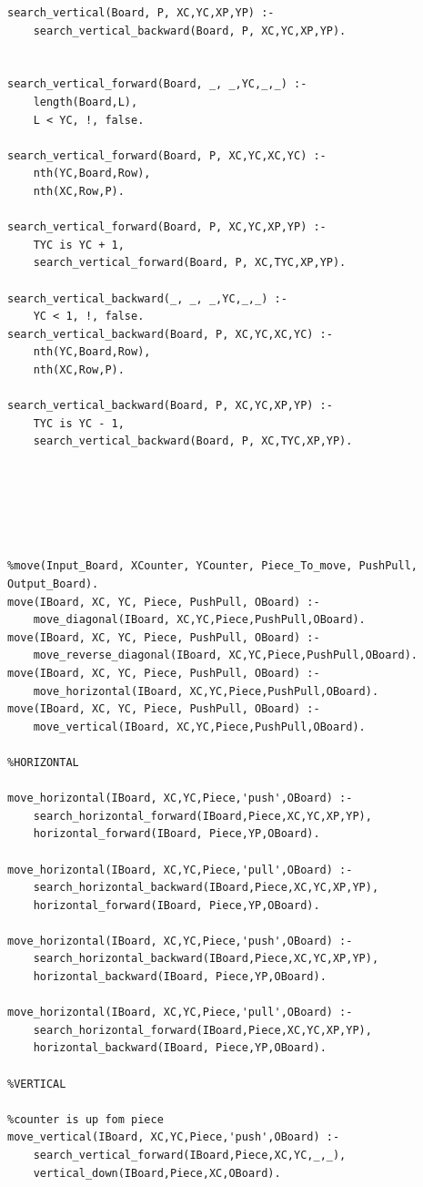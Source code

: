 \documentclass[15pt,a4paper]{article}
\begin{document}
\begin{verbatim}
search_vertical(Board, P, XC,YC,XP,YP) :- 
	search_vertical_backward(Board, P, XC,YC,XP,YP).


search_vertical_forward(Board, _, _,YC,_,_) :- 
	length(Board,L), 
	L < YC, !, false.
	 
search_vertical_forward(Board, P, XC,YC,XC,YC) :- 
	nth(YC,Board,Row),
	nth(XC,Row,P).
						
search_vertical_forward(Board, P, XC,YC,XP,YP) :- 
	TYC is YC + 1,
	search_vertical_forward(Board, P, XC,TYC,XP,YP).

search_vertical_backward(_, _, _,YC,_,_) :- 
	YC < 1, !, false. 
search_vertical_backward(Board, P, XC,YC,XC,YC) :- 
	nth(YC,Board,Row),
	nth(XC,Row,P).
						
search_vertical_backward(Board, P, XC,YC,XP,YP) :- 
	TYC is YC - 1, 
	search_vertical_backward(Board, P, XC,TYC,XP,YP).


		
		
		

%move(Input_Board, XCounter, YCounter, Piece_To_move, PushPull, Output_Board).
move(IBoard, XC, YC, Piece, PushPull, OBoard) :- 
	move_diagonal(IBoard, XC,YC,Piece,PushPull,OBoard).
move(IBoard, XC, YC, Piece, PushPull, OBoard) :- 
	move_reverse_diagonal(IBoard, XC,YC,Piece,PushPull,OBoard).
move(IBoard, XC, YC, Piece, PushPull, OBoard) :- 
	move_horizontal(IBoard, XC,YC,Piece,PushPull,OBoard).
move(IBoard, XC, YC, Piece, PushPull, OBoard) :- 
	move_vertical(IBoard, XC,YC,Piece,PushPull,OBoard).

%HORIZONTAL

move_horizontal(IBoard, XC,YC,Piece,'push',OBoard) :- 
	search_horizontal_forward(IBoard,Piece,XC,YC,XP,YP),
	horizontal_forward(IBoard, Piece,YP,OBoard).

move_horizontal(IBoard, XC,YC,Piece,'pull',OBoard) :- 
	search_horizontal_backward(IBoard,Piece,XC,YC,XP,YP),
	horizontal_forward(IBoard, Piece,YP,OBoard).
	
move_horizontal(IBoard, XC,YC,Piece,'push',OBoard) :- 
	search_horizontal_backward(IBoard,Piece,XC,YC,XP,YP),
	horizontal_backward(IBoard, Piece,YP,OBoard).

move_horizontal(IBoard, XC,YC,Piece,'pull',OBoard) :- 
	search_horizontal_forward(IBoard,Piece,XC,YC,XP,YP),
	horizontal_backward(IBoard, Piece,YP,OBoard).

%VERTICAL

%counter is up fom piece
move_vertical(IBoard, XC,YC,Piece,'push',OBoard) :- 
	search_vertical_forward(IBoard,Piece,XC,YC,_,_), 
	vertical_down(IBoard,Piece,XC,OBoard).	
	

\end{verbatim}
\end{document}
